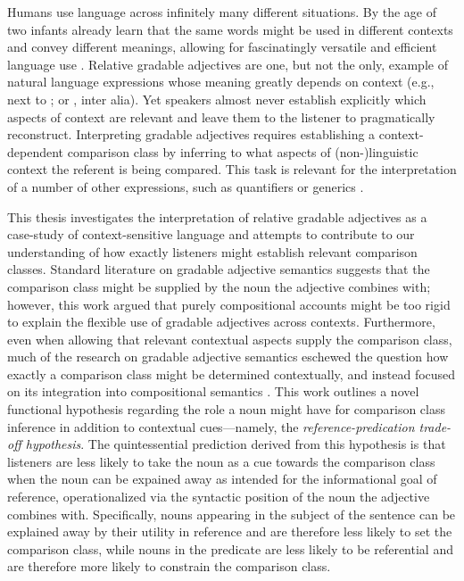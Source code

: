 Humans use language across infinitely many different situations. By the age of two infants already learn that the same words might be used in different contexts and convey different meanings, allowing for fascinatingly versatile and efficient language use \parencite{Mintz2002, ebeling1994children}. 
Relative gradable adjectives are one, but not the only, example of natural language expressions whose meaning greatly depends on context (e.g., next to \textcite[indexicals][]{braun2017}; or \textcite[anaphoras][]{goldberg2017one}, inter alia). Yet speakers almost never establish explicitly which aspects of context are relevant and leave them to the listener to pragmatically reconstruct. Interpreting gradable adjectives requires establishing a context-dependent comparison class by inferring to what aspects of (non-)linguistic context the referent is being compared. This task is relevant for the interpretation of a number of other expressions, such as quantifiers \parencite[e.g., ``John ate \emph{many} hot dogs",][]{scholler2017semantic} or generics \parencite[e.g., ``Dogs are friendly" \emph{[relative to other animals]},][]{tessler2019language}. 

This thesis investigates the interpretation of relative gradable adjectives as a case-study of context-sensitive language and attempts to contribute to our understanding of how exactly listeners might establish relevant comparison classes. 
Standard literature on gradable adjective semantics suggests that the comparison class might be supplied by the noun the adjective combines with; however, this work argued that purely compositional accounts might be too rigid to explain the flexible use of gradable adjectives across contexts. Furthermore, even when allowing that relevant contextual aspects supply the comparison class, much of the research on gradable adjective semantics eschewed the question how exactly a comparison class might be determined contextually, and instead focused on its integration into compositional semantics \parencite{Kennedy2007, kennedy2012, Kamp1975, Cresswell1976, Solt2009}.  This work outlines a novel functional hypothesis regarding the role a noun might have for comparison class inference in addition to contextual cues---namely, the \emph{reference-predication trade-off hypothesis}. The quintessential prediction derived from this hypothesis is that listeners are less likely to take the noun as a cue towards the comparison class when the noun can be expained away as intended for the informational goal of reference, operationalized via the syntactic position of the noun the adjective combines with. Specifically, nouns appearing in the subject of the sentence can be explained away by their utility in reference and are therefore less likely to set the comparison class, while nouns in the predicate are less likely to be referential and are therefore more likely to constrain the comparison class.

